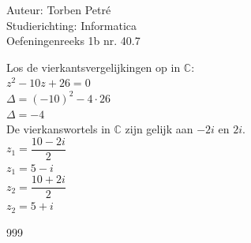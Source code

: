 \documentclass[a4paper]{article}
\newcommand{\C}{\mathbb{C}}
\begin{document}
  
\noindent \large Auteur: Torben Petré \\
\noindent \large Studierichting: Informatica\\
\noindent \large Oefeningenreeks 1b nr. 40.7\\

\medskip

\normalsize

Los de vierkantsvergelijkingen op in $\C$:\\

$z^2 -10z + 26 = 0$\\

$\Delta = (-10)^2 - 4\cdot26$\\

$\Delta = -4$\\

De vierkanswortels in $\C$ zijn gelijk aan $-2i$ en $2i$.\\

$z_1 = \dfrac{10-2i}{2}$\\

$z_1 = 5 - i$\\

$z_2 = \dfrac{10+2i}{2}$\\

$z_2 = 5 + i$\\

\begin{thebibliography}{999}
\end{thebibliography}
\end{document}
